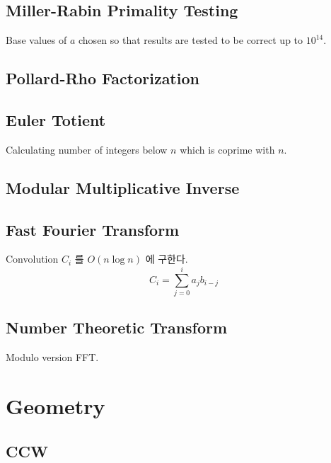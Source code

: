 \documentclass[landscape,8pt]{article}
\begin{document}
\begin{multicols}{2}
  \subsection{Miller-Rabin Primality Testing}
  Base values of $a$ chosen so that results are tested to be correct up to $10^{14}$.
    

  \subsection{Pollard-Rho Factorization}
    

  \subsection{Euler Totient}
  Calculating number of integers below $n$ which is coprime with $n$.
    

  \subsection{Modular Multiplicative Inverse}
    


  \subsection{Fast Fourier Transform}
    Convolution $C_i$ 를 $O(n \log n)$ 에 구한다.
    $$C_i = \sum_{j = 0}^{i} a_j b_{i-j}$$
    
  \subsection{Number Theoretic Transform}
    Modulo version FFT.
    
  \columnbreak
\columnbreak
\section{Geometry}
  \subsection{CCW}
    

\end{multicols}
\end{document}
